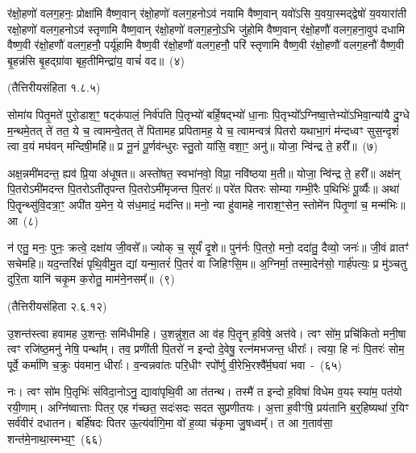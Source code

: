 र॑क्षो॒हणो॑ वलग॒हनः॒ प्रोक्षा॑मि वैष्ण॒वान् र॑क्षो॒हणो॑ वलग॒हनो\-ऽव॑ नयामि वैष्ण॒वान् यवो॑\-ऽसि य॒वया॒स्मद्द्वेषो॑ य॒वयारा॑ती रक्षो॒हणो॑ वलग॒हनो\-ऽव॑ स्तृणामि वैष्ण॒वान् र॑क्षो॒हणो॑ वलग॒हनो॒\-ऽभि जु॑होमि वैष्ण॒वान् र॑क्षो॒हणौ॑ वलग॒हना॒वुप॑ दधामि वैष्ण॒वी र॑क्षो॒हणौ॑ वलग॒हनौ॒ पर्यू॑हामि वैष्ण॒वी र॑क्षो॒हणौ॑ वलग॒हनौ॒ परि॑ स्तृणामि वैष्ण॒वी र॑क्षो॒हणौ॑ वलग॒हनौ॑ वैष्ण॒वी बृ॒हन्न॑सि बृ॒हद्ग्रा॑वा बृह॒तीमिन्द्रा॑य॒ वाचं॑ वद॥~(४)

\centerline{\scriptsize (तैत्तिरीयसंहिता १.८.५)}

सोमा॑य पितृ॒मते॑ पुरो॒डाश॒ꣳ॒ षट्\-क॑पालं॒ निर्व॑पति पि॒तृभ्यो॑ बर्\mbox{}हि॒षद्भ्यो॑ धा॒नाः पि॒तृभ्यो᳚\-ऽग्निष्वा॒त्तेभ्यो॑\-ऽभिवा॒न्या॑यै दु॒ग्धे म॒न्थमे॒तत् ते॑ तत॒ ये च॒ त्वामन्वे॒तत् ते॑ पितामह प्रपितामह॒ ये च॒ त्वामन्वत्र॑ पितरो यथाभा॒गं म॑न्दध्वꣳ सुस॒न्दृशं॑ त्वा व॒यं मघ॑वन् मन्दिषी॒महि॑॥ प्र नू॒नं पू॒र्णव॑न्धुरः स्तु॒तो या॑सि॒ वशा॒ꣳ॒ अनु॑॥ योजा॒ न्वि॑न्द्र ते॒ हरी᳚॥~(७)

अक्ष॒न्नमी॑मदन्त॒ ह्यव॑ प्रि॒या अ॑धूषत॥ अस्तो॑षत॒ स्वभा॑नवो॒ विप्रा॒ नवि॑ष्ठया म॒ती॥ योजा॒ न्वि॑न्द्र ते॒ हरी᳚॥ अक्ष॑न् पि॒तरो\-ऽमी॑मदन्त पि॒तरो\-ऽती॑तृपन्त पि॒तरो\-ऽमी॑मृजन्त पि॒तरः॑॥ परे॑त पितरः सोम्या गम्भी॒रैः प॒थिभिः॑ पू॒र्व्यैः॥ अथा॑ पि॒तॄन्थ्सु॑वि॒दत्रा॒ꣳ॒ अपी॑त य॒मेन॒ ये स॑ध॒मादं॒ मद॑न्ति॥ मनो॒ न्वा हु॑वामहे नाराश॒ꣳ॒सेन॒ स्तोमे॑न पितृ॒णां च॒ मन्म॑भिः॥ आ~(८)

न॑ एतु॒ मनः॒ पुनः॒ क्रत्वे॒ दक्षा॑य जी॒वसे᳚॥ ज्योक् च॒ सूर्यं॑ दृ॒शे॥ पुन॑र्नः पि॒तरो॒ मनो॒ ददा॑तु॒ दैव्यो॒ जनः॑॥ जी॒वं व्रातꣳ॑ सचेमहि॥ यद॒न्तरि॑क्षं पृथि॒वीमु॒त द्यां यन्मा॒तरं॑ पि॒तरं॑ वा जिहिꣳसि॒म॥ अ॒ग्निर्मा॒ तस्मा॒देन॑सो॒ गार्\mbox{}ह॑पत्यः॒ प्र मु॑ञ्चतु दुरि॒ता यानि॑ चकृ॒म क॒रोतु॒ माम॑ने॒नसम्᳚॥~(९)

\centerline{\scriptsize (तैत्तिरीयसंहिता २.६.१२)}

उ॒शन्त॑स्त्वा हवामह उ॒शन्तः॒ समि॑धीमहि। उ॒शन्नु॑श॒त आ व॑ह पि॒तॄन् ह॒विषे॒ अत्त॑वे। त्वꣳ सो॑म॒ प्रचि॑कितो मनी॒षा त्वꣳ रजि॑ष्ठ॒मनु॑ नेषि॒ पन्था᳚म्। तव॒ प्रणी॑ती पि॒तरो॑ न इन्दो दे॒वेषु॒ रत्न॑मभजन्त॒ धीराः᳚। त्वया॒ हि नः॑ पि॒तरः॑ सोम॒ पूर्वे॒ कर्मा॑णि च॒क्रुः प॑वमान॒ धीराः᳚। व॒न्वन्नवा॑तः परि॒धीꣳ रपो᳚र्णु वी॒रेभि॒रश्वै᳚र्म॒घवा॑ भवा~-~(६५)

नः। त्वꣳ सो॑म पि॒तृभिः॑ संविदा॒नो\-ऽनु॒ द्यावा॑पृथि॒वी आ त॑तन्थ। तस्मै॑ त इन्दो ह॒विषा॑ विधेम व॒यꣴ स्या॑म॒ पत॑यो रयी॒णाम्। अग्नि॑ष्वात्ताः पितर॒ एह ग॑च्छत॒ सदः॑सदः सदत सुप्रणीतयः। अ॒त्ता ह॒वीꣳषि॒ प्रय॑तानि ब॒र्॒\mbox{}हिष्यथा॑ र॒यिꣳ सर्व॑वीरं दधातन। बर्\mbox{}हि॑षदः पितर ऊ॒त्य॑र्वागि॒मा वो॑ ह॒व्या च॑कृमा जु॒षध्वम्᳚। त आ ग॒ताव॑सा॒ शन्त॑मे॒नाथा॒स्मभ्य॒ꣳ॒~(६६)

